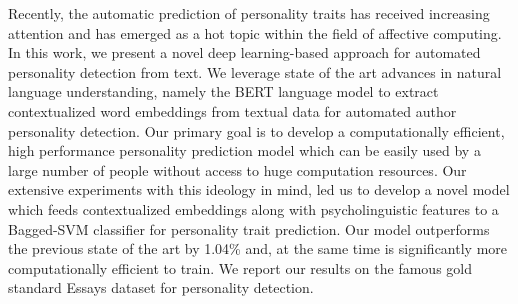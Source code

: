 Recently, the automatic prediction of personality traits has received increasing attention and has emerged as a hot topic within the field of affective computing. In this work, we present a novel deep learning-based approach for automated personality detection from text. We leverage state of the art advances in natural language understanding, namely the BERT language model to extract contextualized word embeddings from textual data for automated author personality detection. Our primary goal is to develop a computationally efficient, high performance personality prediction model which can be easily used by a large number of people without access to huge computation resources. Our extensive experiments with this ideology in mind, led us to develop a novel model which feeds contextualized embeddings along with psycholinguistic features to a Bagged-SVM classifier for personality trait prediction. Our model outperforms the previous state of the art by 1.04\% and, at the same time is significantly more computationally efficient to train. We report our results on the famous gold standard Essays dataset for personality detection.
